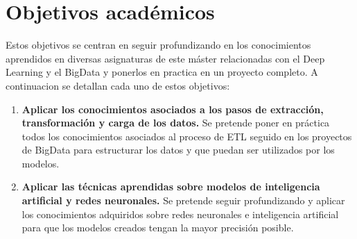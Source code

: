 







 
\section{Objetivos académicos}
Estos objetivos se centran en seguir profundizando en los conocimientos aprendidos en diversas asignaturas de este máster relacionadas con el Deep Learning y el BigData y ponerlos en practica en un proyecto completo. A continuacion se detallan cada uno de estos objetivos:

\begin{enumerate}

    \item \textbf{Aplicar los conocimientos asociados a los pasos de extracción, transformación y carga de los datos.} Se pretende poner en práctica todos los conocimientos asociados al proceso de ETL seguido en los proyectos de BigData para estructurar los datos y que puedan ser utilizados por los modelos.
    \item \textbf{Aplicar las técnicas aprendidas sobre modelos de inteligencia artificial y redes neuronales.} Se pretende seguir profundizando y aplicar los conocimientos adquiridos sobre redes neuronales e inteligencia artificial para que los modelos creados tengan la mayor precisión posible.
    
 \end{enumerate}
